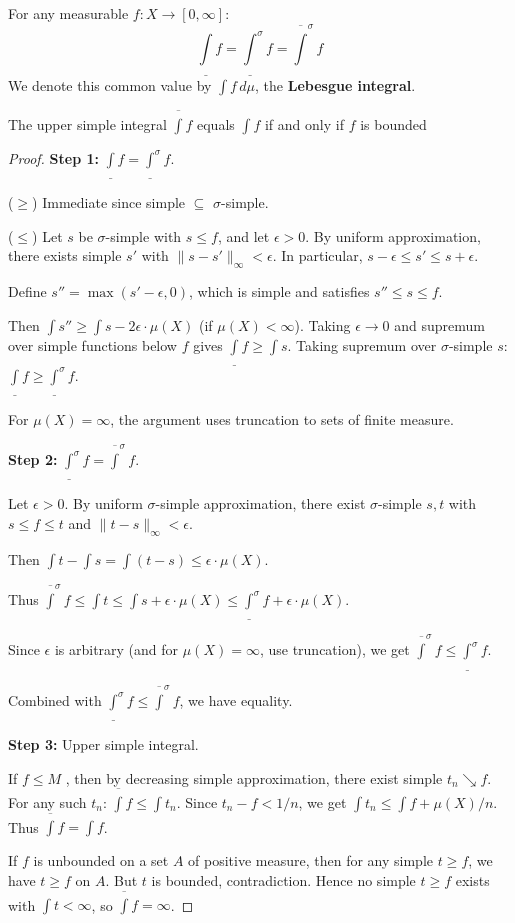 \begin{theorem}
For any measurable $f: X \to [0, \infty]$:
\[ \underline{\int} f = \underline{\int}^\sigma f = \overline{\int}^\sigma f \]
We denote this common value by $\int f \, d\mu$, the \textbf{Lebesgue integral}.

The upper simple integral $\overline{\int} f$ equals $\int f$ if and only if $f$ is bounded \almosteverywhere{}
\end{theorem}

\begin{proof}
\textbf{Step 1:} $\underline{\int} f = \underline{\int}^\sigma f$.

($\geq$) Immediate since simple $\subseteq$ $\sigma$-simple.

($\leq$) Let $s$ be $\sigma$-simple with $s \leq f$, and let $\epsilon > 0$. By uniform approximation, there exists simple $s'$ with $\|s - s'\|_\infty < \epsilon$. In particular, $s - \epsilon \leq s' \leq s + \epsilon$.

Define $s'' = \max(s' - \epsilon, 0)$, which is simple and satisfies $s'' \leq s \leq f$.

Then $\int s'' \geq \int s - 2\epsilon \cdot \mu(X)$ (if $\mu(X) < \infty$). Taking $\epsilon \to 0$ and supremum over simple functions below $f$ gives $\underline{\int} f \geq \int s$. Taking supremum over $\sigma$-simple $s$: $\underline{\int} f \geq \underline{\int}^\sigma f$.

For $\mu(X) = \infty$, the argument uses truncation to sets of finite measure.

\textbf{Step 2:} $\underline{\int}^\sigma f = \overline{\int}^\sigma f$.

Let $\epsilon > 0$. By uniform $\sigma$-simple approximation, there exist $\sigma$-simple $s, t$ with $s \leq f \leq t$ and $\|t - s\|_\infty < \epsilon$.

Then $\int t - \int s = \int (t - s) \leq \epsilon \cdot \mu(X)$.

Thus $\overline{\int}^\sigma f \leq \int t \leq \int s + \epsilon \cdot \mu(X) \leq \underline{\int}^\sigma f + \epsilon \cdot \mu(X)$.

Since $\epsilon$ is arbitrary (and for $\mu(X) = \infty$, use truncation), we get $\overline{\int}^\sigma f \leq \underline{\int}^\sigma f$.

Combined with $\underline{\int}^\sigma f \leq \overline{\int}^\sigma f$, we have equality.

\textbf{Step 3:} Upper simple integral.

If $f \leq M$ \almosteverywhere{}, then by decreasing simple approximation, there exist simple $t_n \searrow f$. For any such $t_n$: $\overline{\int} f \leq \int t_n$. Since $t_n - f < 1/n$, we get $\int t_n \leq \int f + \mu(X)/n$. Thus $\overline{\int} f = \int f$.

If $f$ is unbounded on a set $A$ of positive measure, then for any simple $t \geq f$, we have $t \geq f$ on $A$. But $t$ is bounded, contradiction. Hence no simple $t \geq f$ exists with $\int t < \infty$, so $\overline{\int} f = \infty$.
\end{proof}

